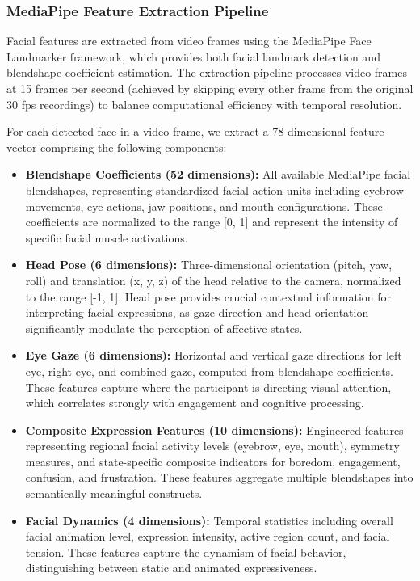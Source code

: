 \documentclass[11pt,a4paper]{article}
\begin{document}
\subsubsection{MediaPipe Feature Extraction Pipeline}

Facial features are extracted from video frames using the MediaPipe Face Landmarker framework, which provides both facial landmark detection and blendshape coefficient estimation. The extraction pipeline processes video frames at 15 frames per second (achieved by skipping every other frame from the original 30 fps recordings) to balance computational efficiency with temporal resolution.

For each detected face in a video frame, we extract a 78-dimensional feature vector comprising the following components:

\begin{itemize}
    \item \textbf{Blendshape Coefficients (52 dimensions):} All available MediaPipe facial blendshapes, representing standardized facial action units including eyebrow movements, eye actions, jaw positions, and mouth configurations. These coefficients are normalized to the range [0, 1] and represent the intensity of specific facial muscle activations.

    \item \textbf{Head Pose (6 dimensions):} Three-dimensional orientation (pitch, yaw, roll) and translation (x, y, z) of the head relative to the camera, normalized to the range [-1, 1]. Head pose provides crucial contextual information for interpreting facial expressions, as gaze direction and head orientation significantly modulate the perception of affective states.

    \item \textbf{Eye Gaze (6 dimensions):} Horizontal and vertical gaze directions for left eye, right eye, and combined gaze, computed from blendshape coefficients. These features capture where the participant is directing visual attention, which correlates strongly with engagement and cognitive processing.

    \item \textbf{Composite Expression Features (10 dimensions):} Engineered features representing regional facial activity levels (eyebrow, eye, mouth), symmetry measures, and state-specific composite indicators for boredom, engagement, confusion, and frustration. These features aggregate multiple blendshapes into semantically meaningful constructs.

    \item \textbf{Facial Dynamics (4 dimensions):} Temporal statistics including overall facial animation level, expression intensity, active region count, and facial tension. These features capture the dynamism of facial behavior, distinguishing between static and animated expressiveness.
\end{itemize}
\end{document}
